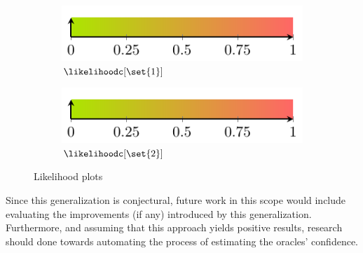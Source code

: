 \begin{figure}[!ht]
  \begin{subfigure}{0.45\columnwidth}
    \includegraphics[page=4]{figures/conclusions/figures/main.pdf}
    \caption{$\likelihoodc[\set{1}]$}
  \end{subfigure}
  \begin{subfigure}{0.45\columnwidth}
    \includegraphics[page=5]{figures/conclusions/figures/main.pdf}
    \caption{$\likelihoodc[\set{2}]$}
  \end{subfigure}

  \caption{Likelihood plots \label{fig:conclusions:likelihood-plots}}
\end{figure}


Since this generalization is conjectural, future work in this scope
would include evaluating the improvements (if any) introduced by this
generalization.
%
Furthermore, and assuming that this approach yields positive results,
research should done towards automating the process of estimating the
oracles' confidence.
